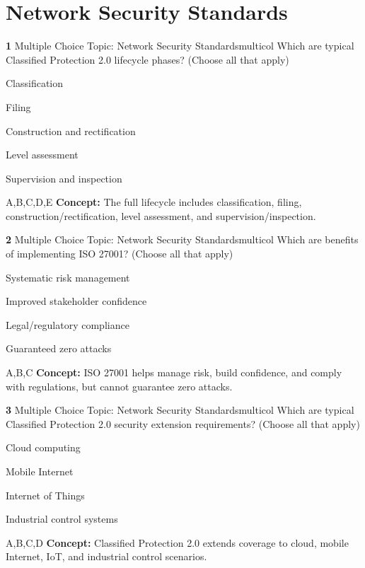 \documentclass[10pt,a4paper]{article}
\begin{document}
\section{Network Security Standards}
\begin{qcard}{\color{white}\textbf{1} \hfill \small Multiple Choice \textbar{} Topic: Network Security Standards}{multicol}
Which are typical Classified Protection 2.0 lifecycle phases? (Choose all that apply)

\begin{qoptions}
\item Classification
\item Filing
\item Construction and rectification
\item Level assessment
\item Supervision and inspection
\end{qoptions}
\begin{explainbox}{A,B,C,D,E}
\textbf{Concept:} The full lifecycle includes classification, filing, construction/rectification, level assessment, and supervision/inspection.
\end{explainbox}
\end{qcard}

\begin{qcard}{\color{white}\textbf{2} \hfill \small Multiple Choice \textbar{} Topic: Network Security Standards}{multicol}
Which are benefits of implementing ISO 27001? (Choose all that apply)

\begin{qoptions}
\item Systematic risk management
\item Improved stakeholder confidence
\item Legal/regulatory compliance
\item Guaranteed zero attacks
\end{qoptions}
\begin{explainbox}{A,B,C}
\textbf{Concept:} ISO 27001 helps manage risk, build confidence, and comply with regulations, but cannot guarantee zero attacks.
\end{explainbox}
\end{qcard}

\begin{qcard}{\color{white}\textbf{3} \hfill \small Multiple Choice \textbar{} Topic: Network Security Standards}{multicol}
Which are typical Classified Protection 2.0 security extension requirements? (Choose all that apply)

\begin{qoptions}
\item Cloud computing
\item Mobile Internet
\item Internet of Things
\item Industrial control systems
\end{qoptions}
\begin{explainbox}{A,B,C,D}
\textbf{Concept:} Classified Protection 2.0 extends coverage to cloud, mobile Internet, IoT, and industrial control scenarios.
\end{explainbox}
\end{qcard}
\end{document}
